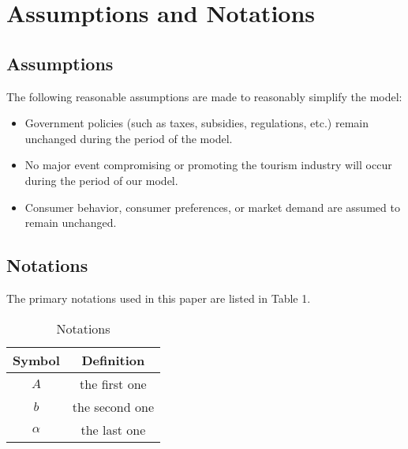 \section{Assumptions and Notations}

\subsection{Assumptions}

The following reasonable assumptions are made to reasonably simplify the model:

\begin{itemize}
  \item Government policies (such as taxes, subsidies, regulations, etc.) remain unchanged during the period of the model.
  \item No major event compromising or promoting the tourism industry will occur during the period of our model.
  \item Consumer behavior, consumer preferences, or market demand are assumed to remain unchanged.
\end{itemize}


\subsection{Notations}

The primary notations used in this paper are listed in Table 1.

\begin{table}[!htbp]
  \begin{center}
  \caption{Notations}
  \begin{tabular}{cc}
    \toprule
    \multicolumn{1}{m{3cm}}{\centering Symbol}
    &\multicolumn{1}{m{8cm}}{\centering Definition}\\
    \midrule
    $A$&the first one\\
    $b$&the second one\\
    $\alpha$ &the last one\\
    \bottomrule
  \end{tabular}
  \end{center}
  \end{table}